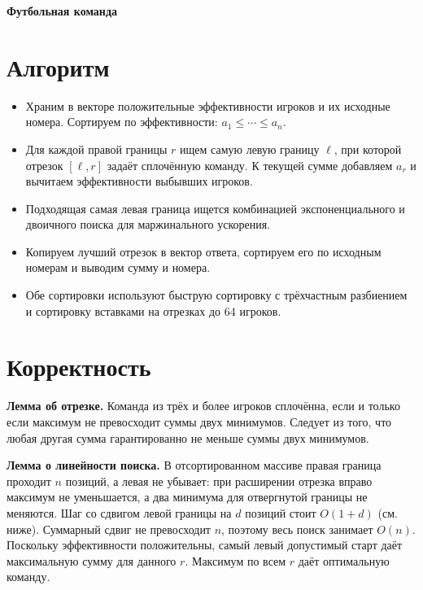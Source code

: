 \documentclass[11pt,a4paper]{article}
\begin{document}
\begin{center}
  {\Large\bfseries Футбольная команда}
\end{center}

\section*{Алгоритм}
\begin{itemize}
  \setlength{\itemsep}{0pt}
  \item Храним в векторе положительные эффективности игроков и их исходные номера.
    Сортируем по эффективности: $a_1 \le \cdots \le a_n$.
  \item Для каждой правой границы $r$ ищем самую левую границу $\ell$, при которой отрезок $[\ell,r]$ задаёт
    сплочённую команду.
    К текущей сумме добавляем $a_r$ и вычитаем эффективности выбывших игроков.
  \item Подходящая самая левая граница ищется комбинацией экспоненциального и двоичного поиска
    для маржинального ускорения.
  \item Копируем лучший отрезок в вектор ответа, сортируем его по исходным номерам и выводим сумму и номера.
  \item Обе сортировки используют быструю сортировку с трёхчастным разбиением и сортировку вставками на отрезках
    до 64 игроков.
\end{itemize}

\section*{Корректность}
\textbf{Лемма об отрезке.}
Команда из трёх и более игроков сплочённа, если и только если максимум не превосходит суммы двух минимумов.
Следует из того, что любая другая сумма гарантированно не меньше суммы двух минимумов.

\medskip
\noindent\textbf{Лемма о линейности поиска.}
В отсортированном массиве правая граница проходит $n$ позиций, а левая не убывает:
при расширении отрезка вправо максимум не уменьшается, а два минимума для отвергнутой границы не меняются.
Шаг со сдвигом левой границы на $d$ позиций стоит $O(1+d)$ (см. ниже).
Суммарный сдвиг не превосходит $n$, поэтому весь поиск занимает $O(n)$.
Поскольку эффективности положительны, самый левый допустимый старт даёт максимальную сумму для данного $r$.
Максимум по всем $r$ даёт оптимальную команду.
\end{document}
